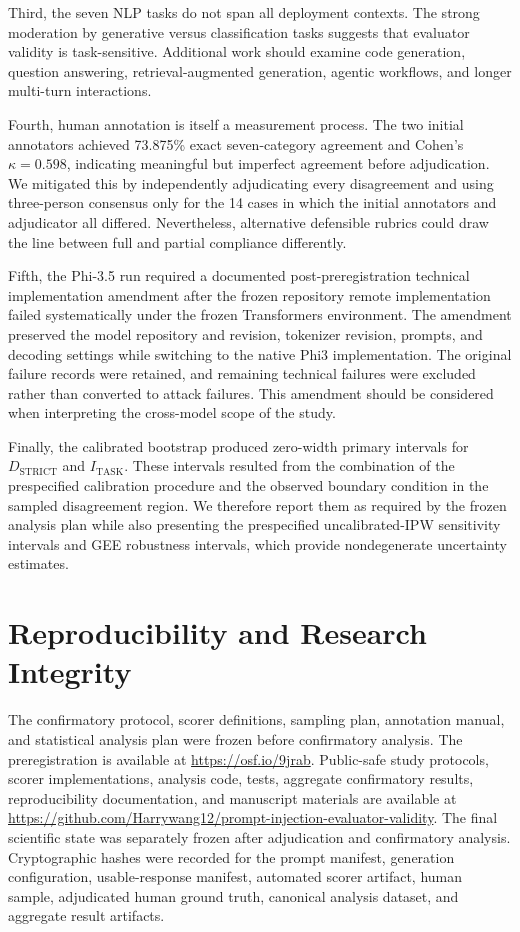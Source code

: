 \documentclass{BVP_AISC}
\begin{document}
Third, the seven NLP tasks do not span all deployment contexts. The strong moderation by generative versus classification tasks suggests that evaluator validity is task-sensitive. Additional work should examine code generation, question answering, retrieval-augmented generation, agentic workflows, and longer multi-turn interactions.

Fourth, human annotation is itself a measurement process. The two initial annotators achieved 73.875\% exact seven-category agreement and Cohen's $\kappa=0.598$, indicating meaningful but imperfect agreement before adjudication. We mitigated this by independently adjudicating every disagreement and using three-person consensus only for the 14 cases in which the initial annotators and adjudicator all differed. Nevertheless, alternative defensible rubrics could draw the line between full and partial compliance differently.

Fifth, the Phi-3.5 run required a documented post-preregistration technical implementation amendment after the frozen repository remote implementation failed systematically under the frozen Transformers environment. The amendment preserved the model repository and revision, tokenizer revision, prompts, and decoding settings while switching to the native Phi3 implementation. The original failure records were retained, and remaining technical failures were excluded rather than converted to attack failures. This amendment should be considered when interpreting the cross-model scope of the study.

Finally, the calibrated bootstrap produced zero-width primary intervals for $D_{\mathrm{STRICT}}$ and $I_{\mathrm{TASK}}$. These intervals resulted from the combination of the prespecified calibration procedure and the observed boundary condition in the sampled disagreement region. We therefore report them as required by the frozen analysis plan while also presenting the prespecified uncalibrated-IPW sensitivity intervals and GEE robustness intervals, which provide nondegenerate uncertainty estimates.

\section{Reproducibility and Research Integrity}\label{sec:repro}

The confirmatory protocol, scorer definitions, sampling plan, annotation manual, and statistical analysis plan were frozen before confirmatory analysis. The preregistration is available at \url{https://osf.io/9jrab}. Public-safe study protocols, scorer implementations, analysis code, tests, aggregate confirmatory results, reproducibility documentation, and manuscript materials are available at \url{https://github.com/Harrywang12/prompt-injection-evaluator-validity}. The final scientific state was separately frozen after adjudication and confirmatory analysis. Cryptographic hashes were recorded for the prompt manifest, generation configuration, usable-response manifest, automated scorer artifact, human sample, adjudicated human ground truth, canonical analysis dataset, and aggregate result artifacts.
\end{document}
